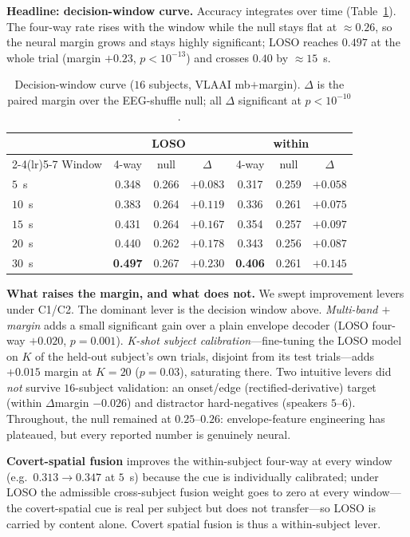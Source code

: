 \documentclass[journal]{IEEEtran}
\begin{document}
\textbf{Headline: decision-window curve.} Accuracy integrates over time
(Table~\ref{tab:curve}). The four-way rate rises with the window while the null stays
flat at $\approx\!0.26$, so the neural margin grows and stays highly significant; LOSO
reaches $0.497$ at the whole trial (margin $+0.23$, $p\!<\!10^{-13}$) and crosses
$0.40$ by $\approx\!15$~s.

\begin{table}[t]
\centering
\caption{Decision-window curve ($16$ subjects, VLAAI mb$+$margin). $\Delta$ is the
paired margin over the EEG-shuffle null; all $\Delta$ significant at $p<10^{-10}$.}
\label{tab:curve}
\small
\begin{tabular}{@{}lccc@{\hskip 10pt}ccc@{}}
\toprule
& \multicolumn{3}{c}{LOSO} & \multicolumn{3}{c}{within} \\
\cmidrule(lr){2-4}\cmidrule(lr){5-7}
Window & 4-way & null & $\Delta$ & 4-way & null & $\Delta$ \\
\midrule
$5$~s  & 0.348 & 0.266 & $+0.083$ & 0.317 & 0.259 & $+0.058$ \\
$10$~s & 0.383 & 0.264 & $+0.119$ & 0.336 & 0.261 & $+0.075$ \\
$15$~s & 0.431 & 0.264 & $+0.167$ & 0.354 & 0.257 & $+0.097$ \\
$20$~s & 0.440 & 0.262 & $+0.178$ & 0.343 & 0.256 & $+0.087$ \\
$30$~s & \textbf{0.497} & 0.267 & $+0.230$ & \textbf{0.406} & 0.261 & $+0.145$ \\
\bottomrule
\end{tabular}
\end{table}

\textbf{What raises the margin, and what does not.} We swept improvement levers under
C1/C2. The dominant lever is the decision window above. \emph{Multi-band $+$ margin}
adds a small significant gain over a plain envelope decoder (LOSO four-way $+0.020$,
$p{=}0.001$). \emph{K-shot subject calibration}---fine-tuning the LOSO model on $K$
of the held-out subject's own trials, disjoint from its test trials---adds
$+0.015$ margin at $K{=}20$ ($p{=}0.03$), saturating there. Two intuitive levers did
\emph{not} survive $16$-subject validation: an onset/edge (rectified-derivative)
target (within $\Delta$margin $-0.026$) and distractor hard-negatives (speakers
$5$--$6$). Throughout, the null remained at $0.25$--$0.26$: envelope-feature
engineering has plateaued, but every reported number is genuinely neural.

\textbf{Covert-spatial fusion} improves the within-subject four-way at every window
(e.g.\ $0.313\!\to\!0.347$ at $5$~s) because the cue is individually calibrated; under
LOSO the admissible cross-subject fusion weight goes to zero at every window---the
covert-spatial cue is real per subject but does not transfer---so LOSO is carried by
content alone. Covert spatial fusion is thus a within-subject lever.
\end{document}
